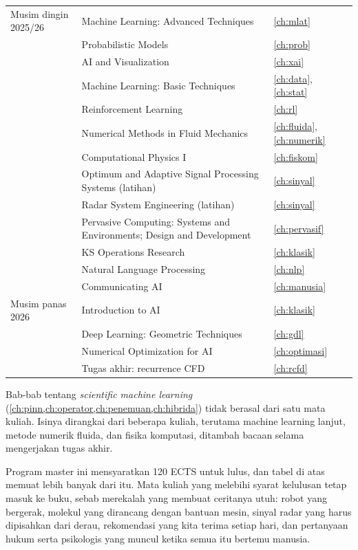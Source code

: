 \begin{table}[ht]
\begin{tabularx}{\linewidth}{@{}p{3.6cm}Xp{1.4cm}@{}}
\midrule
Musim dingin 2025/26
 & Machine Learning: Advanced Techniques & \ref{ch:mlat} \\
 & Probabilistic Models & \ref{ch:prob} \\
 & AI and Visualization & \ref{ch:xai} \\
 & Machine Learning: Basic Techniques & \ref{ch:data}, \ref{ch:stat} \\
 & Reinforcement Learning & \ref{ch:rl} \\
 & Numerical Methods in Fluid Mechanics & \ref{ch:fluida}, \ref{ch:numerik} \\
 & Computational Physics I & \ref{ch:fiskom} \\
 & Optimum and Adaptive Signal Processing Systems (latihan) & \ref{ch:sinyal} \\
 & Radar System Engineering (latihan) & \ref{ch:sinyal} \\
 & Pervasive Computing: Systems and Environments; Design and Development & \ref{ch:pervasif} \\
 & KS Operations Research & \ref{ch:klasik} \\
 & Natural Language Processing & \ref{ch:nlp} \\
 & Communicating AI & \ref{ch:manusia} \\
\midrule
Musim panas 2026
 & Introduction to AI & \ref{ch:klasik} \\
 & Deep Learning: Geometric Techniques & \ref{ch:gdl} \\
 & Numerical Optimization for AI & \ref{ch:optimasi} \\
 & Tugas akhir: recurrence CFD & \ref{ch:rcfd} \\
\bottomrule
\end{tabularx}
\end{table}

Bab-bab tentang \emph{scientific machine learning} (\cref{ch:pinn,ch:operator,ch:penemuan,ch:hibrida})
tidak berasal dari satu mata kuliah. Isinya dirangkai dari beberapa kuliah, terutama machine
learning lanjut, metode numerik fluida, dan fisika komputasi, ditambah bacaan selama
mengerjakan tugas akhir.

Program master ini mensyaratkan 120 ECTS untuk lulus, dan tabel di atas memuat lebih banyak dari itu. Mata kuliah yang melebihi
syarat kelulusan tetap masuk ke buku, sebab merekalah yang membuat ceritanya utuh: robot yang bergerak, molekul yang dirancang dengan
bantuan mesin, sinyal radar yang harus dipisahkan dari derau, rekomendasi yang kita terima setiap hari, dan pertanyaan hukum serta
psikologis yang muncul ketika semua itu bertemu manusia.

